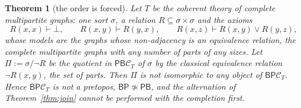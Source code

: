 \documentclass[11pt]{amsart}
\newtheorem{thm}{Theorem}[section]
\theoremstyle{definition}
\newcommand{\PP}{\mathsf P}
\newcommand{\BB}{\mathsf B}
\newcommand{\cC}{\mathcal C}
\begin{document}
\begin{thm}[the order is forced]\label{thm:order}
Let $T$ be the coherent theory of complete multipartite graphs: one
sort $\sigma$, a relation $R\subseteq\sigma\times\sigma$ and the axioms
\[
R(x,x)\vdash\bot,\qquad R(x,y)\vdash R(y,x),\qquad
R(x,z)\vdash R(x,y)\vee R(y,z),
\]
whose models are the graphs whose non-adjacency is an equivalence
relation, the complete multipartite graphs with any number of parts of
any sizes. Let $\Pi:=\sigma/{\neg R}$ be the quotient in $\PP\BB\cC_T$ of
$\sigma$ by the classical equivalence relation $\neg R(x,y)$, the
\emph{set of parts}. Then $\Pi$ is not isomorphic to any object of
$\BB\PP\cC_T$. Hence $\BB\PP\cC_T$ is not a pretopos, $\BB\PP\not\simeq
\PP\BB$, and the alternation of Theorem~\ref{thm:join} cannot be
performed with the completion first.
\end{thm}
\end{document}
